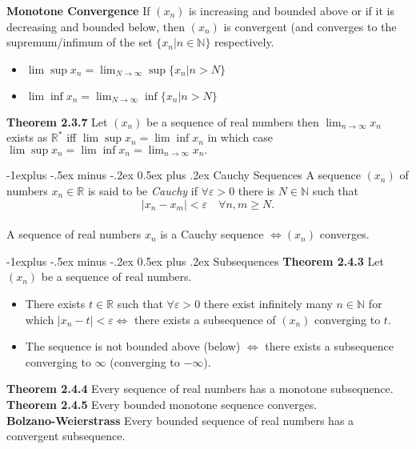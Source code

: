 \documentclass[10pt,landscape]{article}
\makeatletter
\renewcommand{\subsection}{\@startsection{subsection}{2}{0mm}%
                                {-1explus -.5ex minus -.2ex}%
                                {0.5ex plus .2ex}%
                                {\normalfont\normalsize\bfseries}}
\makeatother
\begin{document}
\begin{multicols}{3}
\textbf{Monotone Convergence} If $(x_n)$ is increasing and bounded above or if it is decreasing and bounded below, then $(x_n)$ is convergent (and converges to the supremum/infimum of the set $\{x_n | n \in \mathbb{N} \} $ respectively.

\begin{itemize}
	\item $ \lim \sup x_n = \displaystyle \lim_{N \rightarrow \infty} \sup \{x_n | n >N\}$
	\item $ \lim \inf x_n =  \displaystyle \lim_{N \rightarrow \infty} \inf \{x_n | n >N\}$
\end{itemize}

\textbf{Theorem 2.3.7} Let $(x_n)$ be a sequence of real numbers then  $\displaystyle  \lim_{n \rightarrow \infty} x_n$ exists as $\mathbb{R}^{*}$ iff $ \displaystyle  \lim \sup x_n = \displaystyle  \lim \inf x_n $ in which case $\displaystyle  \lim \sup x_n =\displaystyle  \lim \inf x_n =\displaystyle   \lim_{n \rightarrow \infty} x_n.$

	\subsection{Cauchy Sequences}
	A sequence $(x_n)$ of numbers $x_n \in \mathbb{R}$ is said to be \emph{Cauchy } if $\forall \varepsilon > 0$ there is $N \in \mathbb{N}$ such that \[|x_n - x_m| < \varepsilon \quad \forall n,m \geq N.\] \\
	A sequence of real numbers $x_n$ is a Cauchy sequence $\iff (x_n)$ converges.

	\subsection{Subsequences}
	\textbf{Theorem 2.4.3} Let $(x_n)$ be a sequence of real numbers.
	\begin{itemize}
		\item There exists $t \in \mathbb{R}$ such that $\forall \varepsilon > 0$ there exist infinitely many $ n \in \mathbb{N}$ for which $|x_n-t| < \varepsilon \iff $ there exists a subsequence of $(x_n)$ converging to $t$.
		\item The sequence is not bounded above (below) $\iff$ there exists a subsequence converging to $\infty$ (converging to $-\infty$).
	\end{itemize}

\textbf{Theorem 2.4.4} Every sequence of real numbers has a monotone subsequence.\\
\textbf{Theorem 2.4.5} Every bounded monotone sequence converges.\\
\textbf{Bolzano-Weierstrass} Every bounded sequence of real numbers has a convergent subsequence.



\end{multicols}
\end{document}
